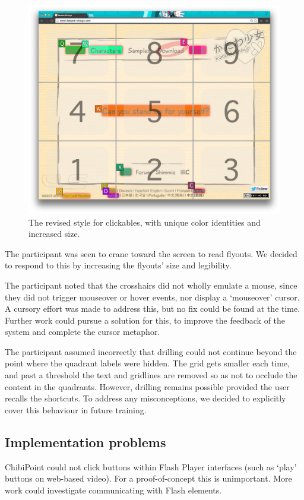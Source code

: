 \documentclass[11pt,openright,a4paper]{report}
\begin{document}
\begin{figure}[ht]
\centering\includegraphics[width=\textwidth]{figures/ImpClickables.png}
\caption{The revised style for clickables, with unique color identities and increased size.}
\label{fig:impClickable}
\end{figure}

\FloatBarrier
The participant was seen to crane toward the screen to read flyouts. We decided to respond to this by increasing the flyouts' size and legibility.

The participant noted that the crosshairs did not wholly emulate a mouse, since they did not trigger mouseover or hover events, nor display a `mouseover' cursor. A cursory effort was made to address this, but no fix could be found at the time. Further work could pursue a solution for this, to improve the feedback of the system and complete the cursor metaphor.

The participant assumed incorrectly that drilling could not continue beyond the point where the quadrant labels were hidden. The grid gets smaller each time, and past a threshold the text and gridlines are removed so as not to occlude the content in the quadrants. However, drilling remains possible provided the user recalls the shortcuts. To address any misconceptions, we decided to explicitly cover this behaviour in future training.

\subsection{Implementation problems}
ChibiPoint could not click buttons within Flash Player interfaces (such as `play' buttons on web-based video). For a proof-of-concept this is unimportant. More work could investigate communicating with Flash elements.
\end{document}
